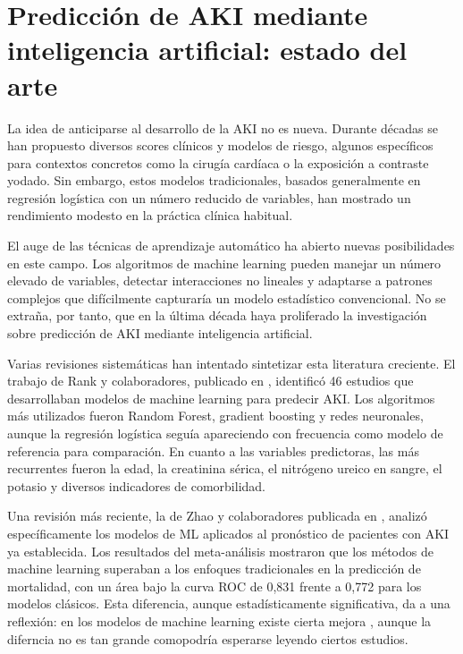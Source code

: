 \documentclass[12pt, a4paper, oneside]{report}
\begin{document}
\section{Predicción de AKI mediante inteligencia artificial: estado del arte}

La idea de anticiparse al desarrollo de la AKI no es nueva. Durante décadas se han propuesto diversos scores clínicos y modelos de riesgo, algunos específicos para contextos concretos como la cirugía cardíaca o la exposición a contraste yodado. Sin embargo, estos modelos tradicionales, basados generalmente en regresión logística con un número reducido de variables, han mostrado un rendimiento modesto en la práctica clínica habitual.

El auge de las técnicas de aprendizaje automático ha abierto nuevas posibilidades en este campo. Los algoritmos de machine learning pueden manejar un número elevado de variables, detectar interacciones no lineales y adaptarse a patrones complejos que difícilmente capturaría un modelo estadístico convencional. No se extraña, por tanto, que en la última década haya proliferado la investigación sobre predicción de AKI mediante inteligencia artificial.

Varias revisiones sistemáticas han intentado sintetizar esta literatura creciente. El trabajo de Rank y colaboradores, publicado en \parencite{rank2022mlaki}, identificó 46 estudios que desarrollaban modelos de machine learning para predecir AKI. Los algoritmos más utilizados fueron Random Forest, gradient boosting y redes neuronales, aunque la regresión logística seguía apareciendo con frecuencia como modelo de referencia para comparación. En cuanto a las variables predictoras, las más recurrentes fueron la edad, la creatinina sérica, el nitrógeno ureico en sangre, el potasio y diversos indicadores de comorbilidad. 

Una revisión más reciente, la de Zhao y colaboradores publicada en \parencite{zhao2024akiml}, analizó específicamente los modelos de ML aplicados al pronóstico de pacientes con AKI ya establecida. Los resultados del meta-análisis mostraron que los métodos de machine learning superaban a los enfoques tradicionales en la predicción de mortalidad, con un área bajo la curva ROC de 0,831 frente a 0,772 para los modelos clásicos. Esta diferencia, aunque estadísticamente significativa, da a una reflexión: en los modelos de machine learning existe cierta mejora , aunque la diferncia no es tan grande comopodría esperarse leyendo ciertos estudios.
\end{document}
